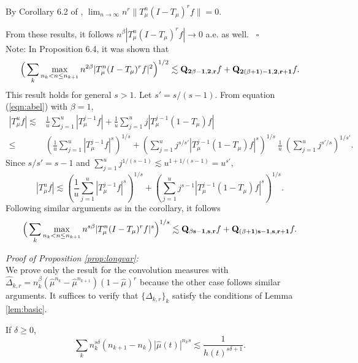\documentclass[11pt]{amsart}
\theoremstyle{definition}
\theoremstyle{remark}
\begin{document}
By Corollary 6.2 of \cite{CCL}, $\lim_{n\to \infty} n^{r} \lVert T_{\mu}^n(I - T_{\mu})^{r}f \rVert = 0$.

From these results, it follows $n^{\beta} |T_{\mu}^n(I - T_{\mu})^{r}f|\to 0$ a.e. as well.
~\hfill$\square$ \bigskip\\
%

Note: In  \cite{CCL} Proposition 6.4, it was shown that 
\begin{equation*}
\Big( \sum_k \max_{n_{k}<n\le n_{k+1}} n^{2\beta} |T_{\mu}^{n}(I-T_{\mu})^{r} f|^2\Big)^{1/2} \lesssim 
{\bf Q_{2\beta -1,2,r}}f + {\bf Q_{2(\beta+1)-1 ,2,r+1}}f.
\end{equation*}
This result holds for general $s>1$. 
Let  $s'=s/(s-1)$.
From equation (\ref{eqn:abel}) with $\beta=1$,
\begin{align*}
 |T_{\mu}^{u} f| 
\lesssim & \frac 1u\sum_{j=1}^{u}  |T_{\mu}^{j-1}  f| 
 + \frac 1u \sum_{j=1}^{u} j |T_{\mu}^{j-1}(1-T_{\mu})f|\\
 \le & \left( \frac 1u\sum_{j=1}^{u}  |T_{\mu}^{j-1}  f|^s \right)^{1/s} +  
  \left( \sum_{j=1}^{u} j^{s/s'} |T_{\mu}^{j-1}(1-T_{\mu})f|^s\right)^{1/s} \  \frac 1u \ \left(\sum_{j=1}^{u} j^{s'/s} \right)^{1/s'}.
\end{align*}
Since $s/s'=s-1$ and $\sum_{j=1}^{u} j^{1/(s-1)} \lesssim u^{1+1/(s-1)}=u^{s'}$, 
\[ |T_{\mu}^{u} f| \lesssim \left( \frac 1u\sum_{j=1}^{u}  |T_{\mu}^{j-1}  f|^s \right)^{1/s} +  
  \left( \sum_{j=1}^{u} j^{s-1} |T_{\mu}^{j-1}(1-T_{\mu})f|^s\right)^{1/s}.\]
Following similar arguments as in the corollary, it follows
\begin{equation}
\Big( \sum_k \max_{n_{k}<n\le n_{k+1}} n^{s\beta} |T_{\mu}^{n}(I-T_{\mu})^{r} f|^s\Big)^{1/s} \lesssim 
{\bf Q_{\beta s -1,s,r}}f + {\bf Q_{(\beta+1) s-1 ,s,r+1}}f.\label{eqn:summaxs}
\end{equation}

\medskip

\noindent \textit{ Proof of Proposition \ref{prop:longvar}:}\\
We prove only the result for the convolution measures with $\hat \Delta_{k,r}=n_k^{\beta} ({\hat\mu}^{n_k}  - {\hat\mu}^{n_{k+1}})(1-\hat \mu)^r$ because the other case follows similar arguments.
It suffices to verify that  $\{\Delta_{k,r}\}_k$ satisfy the conditions of Lemma \ref{lem:basic}. 



If $\delta\ge 0$,
 \begin{equation*}\sum_k n_k^{s\delta} (n_{k+1}-n_k) |\hat\mu(t)|^{n_k s}\lesssim \frac1{h(t)^{s\delta+1}} . %
 \end{equation*} %
\end{document}
